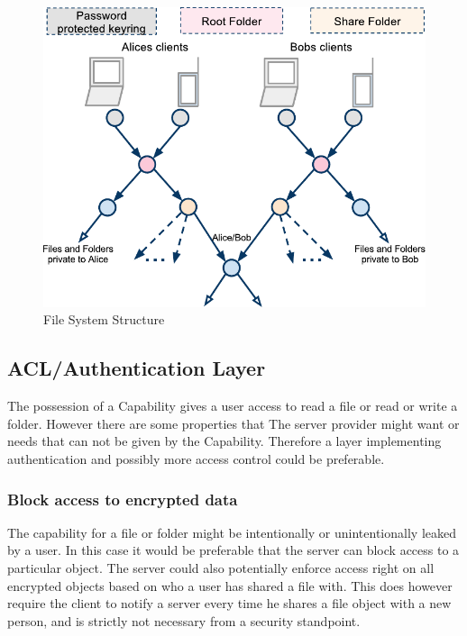 \documentclass[pdftex,english,10pt,b5paper,twoside]{book}
\begin{document}
\begin{figure}[h!]
    \centering
    \includegraphics[width=\columnwidth]{ArchitectureFileSystem.pdf}
    \caption{File System Structure}
    \label{fig:AS:filesystem}
\end{figure}

\subsection{ACL/Authentication Layer}

The possession of a Capability gives a user access to read a file or read or
write a folder. However there are some properties that The server provider
might want or needs that can not be given by the Capability. Therefore a layer
implementing authentication and possibly more access control could be
preferable.

\subsubsection{Block access to encrypted data}

The capability for a file or folder might be intentionally or unintentionally
leaked by a user. In this case it would be preferable that the server can block
access to a particular object. The server could also potentially enforce access
right on all encrypted objects based on who a user has shared a file with.
This does however require the client to notify a server every time he shares a
file object with a new person, and is strictly not necessary from a security
standpoint.
\end{document}
